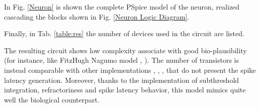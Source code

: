 \documentclass[review]{elsarticle}
\begin{document}
In Fig. \ref{Neuron} is shown the complete PSpice model of the neuron, realized cascading the blocks shown in Fig. \ref{Neuron Logic Diagram}. 


Finally, in Tab. \ref{table:res} the number of devices used in the circuit are listed. 

The resulting circuit shows low complexity associate with good bio-plausibility (for instance, like FitzHugh Nagumo model \cite{Izhikevich2004}, \cite{fitzhugh1961impulses}). The number of transistors is instead comparable with other implementations \cite{rangan2010subthreshold}, \cite{demirkol2011low}, \cite{Binczak2010}, \cite{Petrovas2012} that do not present the spike latency generation. Moreover, thanks to the implementation of subthreshold integration, refractoriness and spike latency behavior, this model mimics quite well the biological counterpart.

\end{document}

